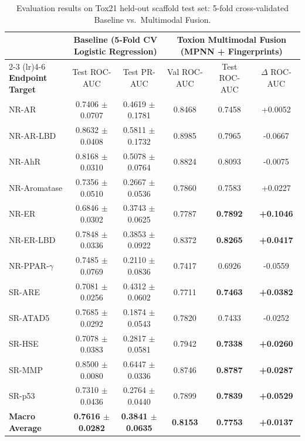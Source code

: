 \documentclass[conference]{IEEEtran}
\begin{document}
\begin{table}[t]
\centering\small
\setlength{\tabcolsep}{6pt}
\caption{Evaluation results on Tox21 held-out scaffold test set: 5-fold cross-validated Baseline vs.\ Multimodal Fusion.}\label{tab:comparison}
\begin{tabular}{@{}lccccc@{}}
\toprule
& \multicolumn{2}{c}{\textbf{Baseline (5-Fold CV Logistic Regression)}} & \multicolumn{3}{c}{\textbf{Toxion Multimodal Fusion (MPNN + Fingerprints)}} \\
\cmidrule(lr){2-3} \cmidrule(lr){4-6}
\textbf{Endpoint Target} & Test ROC-AUC & Test PR-AUC & Val ROC-AUC & Test ROC-AUC & $\Delta$ ROC-AUC \\
\midrule
NR-AR & 0.7406 $\pm$ 0.0707 & 0.4619 $\pm$ 0.1781 & 0.8468 & 0.7458 & +0.0052 \\
NR-AR-LBD & 0.8632 $\pm$ 0.0408 & 0.5811 $\pm$ 0.1732 & 0.8985 & 0.7965 & -0.0667 \\
NR-AhR & 0.8168 $\pm$ 0.0310 & 0.5078 $\pm$ 0.0764 & 0.8824 & 0.8093 & -0.0075 \\
NR-Aromatase & 0.7356 $\pm$ 0.0510 & 0.2667 $\pm$ 0.0536 & 0.7860 & 0.7583 & +0.0227 \\
NR-ER & 0.6846 $\pm$ 0.0302 & 0.3743 $\pm$ 0.0625 & 0.7787 & \textbf{0.7892} & \textbf{+0.1046} \\
NR-ER-LBD & 0.7848 $\pm$ 0.0336 & 0.3853 $\pm$ 0.0922 & 0.8372 & \textbf{0.8265} & \textbf{+0.0417} \\
NR-PPAR-$\gamma$ & 0.7485 $\pm$ 0.0769 & 0.2110 $\pm$ 0.0836 & 0.7417 & 0.6926 & -0.0559 \\
SR-ARE & 0.7081 $\pm$ 0.0256 & 0.4312 $\pm$ 0.0602 & 0.7711 & \textbf{0.7463} & \textbf{+0.0382} \\
SR-ATAD5 & 0.7685 $\pm$ 0.0292 & 0.1874 $\pm$ 0.0543 & 0.7820 & 0.7433 & -0.0252 \\
SR-HSE & 0.7078 $\pm$ 0.0383 & 0.2817 $\pm$ 0.0581 & 0.7942 & \textbf{0.7338} & \textbf{+0.0260} \\
SR-MMP & 0.8500 $\pm$ 0.0080 & 0.6447 $\pm$ 0.0336 & 0.8746 & \textbf{0.8787} & \textbf{+0.0287} \\
SR-p53 & 0.7310 $\pm$ 0.0436 & 0.2764 $\pm$ 0.0440 & 0.7899 & \textbf{0.7839} & \textbf{+0.0529} \\
\midrule
\textbf{Macro Average} & \textbf{0.7616 $\pm$ 0.0282} & \textbf{0.3841 $\pm$ 0.0635} & \textbf{0.8153} & \textbf{0.7753} & \textbf{+0.0137} \\
\bottomrule
\end{tabular}
\end{table}
\end{document}
